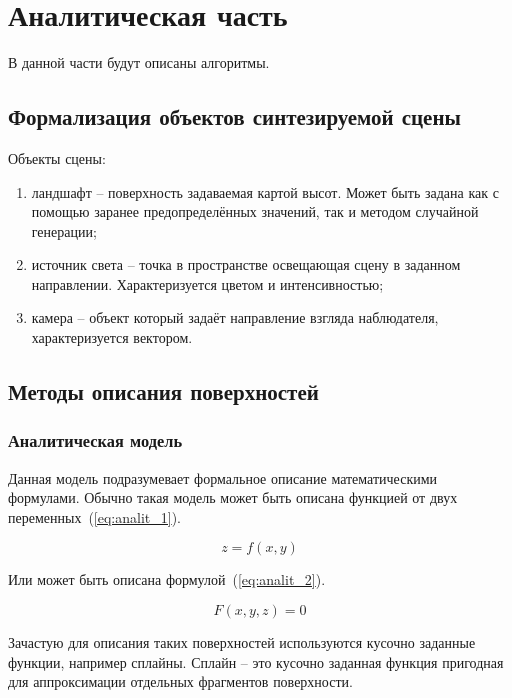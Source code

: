 \chapter{Аналитическая часть}

В данной части будут описаны алгоритмы.

\section{Формализация объектов синтезируемой сцены}

Объекты сцены:
\begin{enumerate}
	\item ландшафт -- поверхность задаваемая картой высот. Может быть задана как с помощью заранее предопределённых значений, так и методом случайной генерации;
	\item источник света -- точка в пространстве освещающая сцену в заданном направлении. Характеризуется цветом и интенсивностью;
	\item камера -- объект который задаёт направление взгляда наблюдателя, характеризуется вектором. 
\end{enumerate}

\section{Методы описания поверхностей}

\subsection{Аналитическая модель}

Данная модель подразумевает формальное описание математическими формулами. Обычно такая модель может быть описана функцией от двух переменных~(\ref{eq:analit_1}).

\begin{equation}
	z = f(x, y)
	\label{eq:analit_1}
\end{equation}

Или может быть описана формулой~(\ref{eq:analit_2}).

\begin{equation}
	F(x, y, z) = 0
	\label{eq:analit_2}
\end{equation}

Зачастую для описания таких поверхностей используются кусочно заданные функции, например сплайны. Сплайн -- это кусочно заданная функция пригодная для аппроксимации отдельных фрагментов поверхности. 

